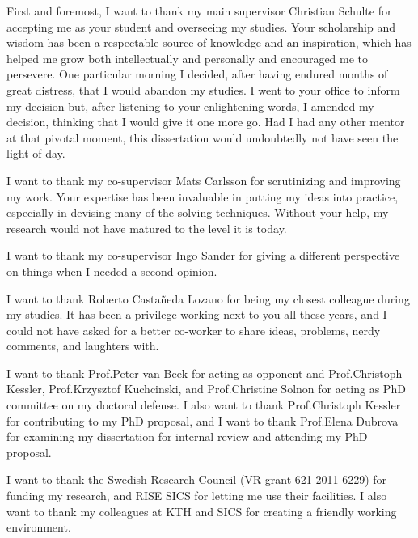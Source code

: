%

\begin{acknowledgements}
  First and foremost, I want to thank my main supervisor Christian Schulte for
  accepting me as your student and overseeing my studies.
  Your scholarship and wisdom has been a respectable source of knowledge and an
  inspiration, which has helped me grow both intellectually and personally and
  encouraged me to persevere.
  One particular morning I decided, after having endured months of great
  distress, that I would abandon my studies.
  I went to your office to inform my decision but, after listening to your
  enlightening words, I amended my decision, thinking that I would give it one
  more go.
  Had I had any other mentor at that pivotal moment, this dissertation would
  undoubtedly not have seen the light of day.

  I want to thank my co-supervisor Mats Carlsson for scrutinizing and improving
  my work.
  Your expertise has been invaluable in putting my ideas into practice,
  especially in devising many of the solving techniques.
  Without your help, my research would not have matured to the level it is
  today.

  I want to thank my co-supervisor Ingo Sander for giving a different
  perspective on things when I needed a second opinion.

  I want to thank Roberto Casta\~neda Lozano for being my closest colleague
  during my studies.
  It has been a privilege working next to you all these years, and I could not
  have asked for a better co-worker to share ideas, problems, nerdy comments,
  and laughters with.

  I want to thank Prof.\thinspace Peter van Beek for acting as opponent and
  Prof.\thinspace Christoph Kessler, Prof.\thinspace Krzysztof Kuchcinski, and
  Prof.\thinspace Christine Solnon for acting as PhD committee on my doctoral
  defense.
  I also want to thank Prof.\thinspace Christoph Kessler for contributing to my
  PhD proposal, and I want to thank Prof.\thinspace Elena Dubrova for examining
  my dissertation for internal review and attending my PhD proposal.

  I want to thank the Swedish Research Council (VR grant 621-2011-6229) for
  funding my research, and RISE SICS for letting me use their facilities.
  I also want to thank my colleagues at KTH and SICS for creating a friendly
  working environment.


\end{acknowledgements}
